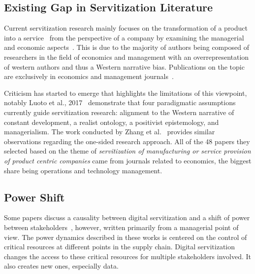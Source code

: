 \documentclass[sigplan,screen,nonacm]{acmart}
\begin{document}
\subsection{Existing Gap in Servitization Literature}
Current servitization research mainly focuses on the transformation of a product into a service~\cite{rabetino2017strategy} from the perspective of a company by examining the managerial and economic aspects~\cite{kowalkowski2017servitization}. This is due to the majority of authors being composed of researchers in the field of economics and management with an overrepresentation of western authors and thus a Western narrative bias\cite{luoto2017critical}. Publications on the topic are exclusively in economics and management journals~\cite{kowalkowski2017servitization, luoto2017critical, gebauer2021digital}. 

Criticism has started to emerge that highlights the limitations of this viewpoint, notably Luoto et al., 2017~\cite{luoto2017critical} demonstrate that four paradigmatic assumptions currently guide servitization research: alignment to the Western narrative of constant development, a realist ontology, a positivist epistemology, and managerialism. The work conducted by Zhang et al.~\cite{zhang2017challenges} provides similar observations regarding the one-sided research approach. All of the 48 papers they selected based on the theme of \textit{servitization of manufacturing or service provision of product centric companies} came from journals related to economics, the biggest share being operations and technology management. 

\subsection{Power Shift}
Some papers discuss a causality between digital servitization and a shift of power between stakeholders~\cite{vendrell2017servitization, mosch2021trapped}, however, written primarily from a managerial point of view. The power dynamics described in these works is centered on the control of critical resources at different points in the supply chain. Digital servitization changes the access to these critical resources for multiple stakeholders involved. It also creates new ones, especially data.
\end{document}
